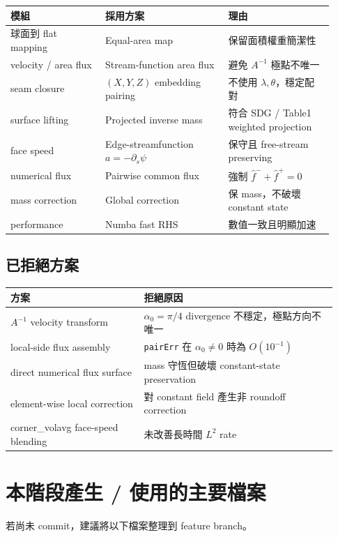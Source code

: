 \documentclass[UTF8,12pt,a4paper]{ctexart}
\begin{document}
\begin{longtable}{p{0.27\linewidth}p{0.35\linewidth}p{0.30\linewidth}}
\toprule
模組 & 採用方案 & 理由 \\
\midrule
\endhead
球面到 flat mapping & Equal-area map & 保留面積權重簡潔性 \\
velocity / area flux & Stream-function area flux & 避免 $A^{-1}$ 極點不唯一 \\
seam closure & $(X,Y,Z)$ embedding pairing & 不使用 $\lambda,\theta$，穩定配對 \\
surface lifting & Projected inverse mass & 符合 SDG / Table1 weighted projection \\
face speed & Edge-streamfunction $a=-\partial_s\psi$ & 保守且 free-stream preserving \\
numerical flux & Pairwise common flux & 強制 $\hat f^-+\hat f^+=0$ \\
mass correction & Global correction & 保 mass，不破壞 constant state \\
performance & Numba fast RHS & 數值一致且明顯加速 \\
\bottomrule
\end{longtable}

\subsection{已拒絕方案}

\begin{longtable}{p{0.38\linewidth}p{0.55\linewidth}}
\toprule
方案 & 拒絕原因 \\
\midrule
\endhead
$A^{-1}$ velocity transform & $\alpha_0=\pi/4$ divergence 不穩定，極點方向不唯一 \\
local-side flux assembly & \texttt{pairErr} 在 $\alpha_0\neq0$ 時為 $O(10^{-1})$ \\
direct numerical flux surface & mass 守恆但破壞 constant-state preservation \\
element-wise local correction & 對 constant field 產生非 roundoff correction \\
corner\_volavg face-speed blending & 未改善長時間 $L^2$ rate \\
\bottomrule
\end{longtable}

\section{本階段產生 / 使用的主要檔案}

若尚未 commit，建議將以下檔案整理到 feature branch。
\end{document}
